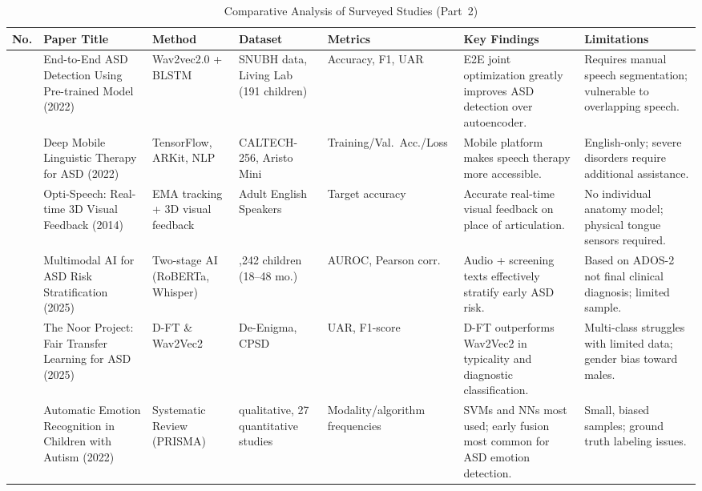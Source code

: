 \documentclass[conference]{IEEEtran}
\newcommand{\comparisonTableSetup}{%
  \small
  \setlength{\tabcolsep}{3pt}%
  \renewcommand{\arraystretch}{1.25}%
}
\begin{document}
\begin{table}[p]
\centering
\caption{Comparative Analysis of Surveyed Studies (Part~2)}
\label{tab:comparative_analysis_part2}
\comparisonTableSetup
\begin{tabularx}{\textwidth}{|>{\hsize=0.20\hsize\raggedright\arraybackslash}X|
                              >{\hsize=1.20\hsize\raggedright\arraybackslash}X|
                              >{\hsize=1.10\hsize\raggedright\arraybackslash}X|
                              >{\hsize=0.90\hsize\raggedright\arraybackslash}X|
                              >{\hsize=0.70\hsize\raggedright\arraybackslash}X|
                              >{\hsize=1.40\hsize\raggedright\arraybackslash}X|
                              >{\hsize=1.50\hsize\raggedright\arraybackslash}X|}
\hline
\textbf{No.} & \textbf{Paper Title} & \textbf{Method} & \textbf{Dataset} & \textbf{Metrics} & \textbf{Key Findings} & \textbf{Limitations} \\
\hline
13 & End-to-End ASD Detection Using Pre-trained Model (2022) & Wav2vec2.0 + BLSTM & SNUBH data, Living Lab (191 children) & Accuracy, F1, UAR & E2E joint optimization greatly improves ASD detection over autoencoder. & Requires manual speech segmentation; vulnerable to overlapping speech. \\
\hline
14 & Deep Mobile Linguistic Therapy for ASD (2022) & TensorFlow, ARKit, NLP & CALTECH-256, Aristo Mini & Training/Val.\ Acc./Loss & Mobile platform makes speech therapy more accessible. & English-only; severe disorders require additional assistance. \\
\hline
15 & Opti-Speech: Real-time 3D Visual Feedback (2014) & EMA tracking + 3D visual feedback & 4 Adult English Speakers & Target accuracy & Accurate real-time visual feedback on place of articulation. & No individual anatomy model; physical tongue sensors required. \\
\hline
16 & Multimodal AI for ASD Risk Stratification (2025) & Two-stage AI (RoBERTa, Whisper) & 1,242 children (18--48 mo.) & AUROC, Pearson corr. & Audio + screening texts effectively stratify early ASD risk. & Based on ADOS-2 not final clinical diagnosis; limited sample. \\
\hline
17 & The Noor Project: Fair Transfer Learning for ASD (2025) & D-FT \& Wav2Vec2 & De-Enigma, CPSD & UAR, F1-score & D-FT outperforms Wav2Vec2 in typicality and diagnostic classification. & Multi-class struggles with limited data; gender bias toward males. \\
\hline
18 & Automatic Emotion Recognition in Children with Autism (2022) & Systematic Review (PRISMA) & 50 qualitative, 27 quantitative studies & Modality/algorithm frequencies & SVMs and NNs most used; early fusion most common for ASD emotion detection. & Small, biased samples; ground truth labeling issues. \\

\end{tabularx}
\end{table}
\end{document}

